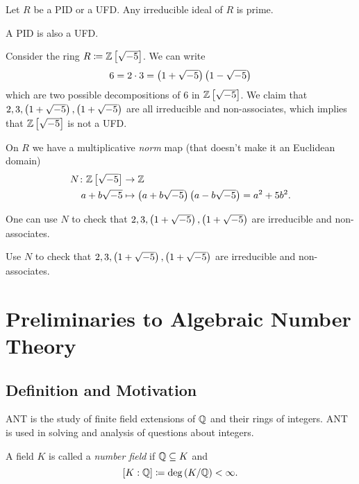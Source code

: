 \documentclass[11pt]{karticle}
\begin{document}
\begin{corollary}
Let $R$ be a PID or a UFD. Any irreducible ideal of $R$ is prime.
\end{corollary}

\begin{exercise}
A PID is also a UFD.
\end{exercise}

\begin{example}
Consider the ring $R \coloneqq \mathbb{Z}\left[ \sqrt{-5} \right]$. We can write
\[6 = 2 \cdot 3 = \left( 1 + \sqrt{-5} \right)\left( 1 - \sqrt{-5} \right)\]
which are two possible decompositions of $6$ in $\mathbb{Z}\left[ \sqrt{-5} \right]$. We claim that $2,3, \left( 1+\sqrt{-5} \right), \left( 1+\sqrt{-5} \right)$ are all irreducible and non-associates, which implies that $\mathbb{Z}\left[ \sqrt{-5} \right]$ is not a UFD.

On $R$ we have a multiplicative \emph{norm} map (that doesn't make it an Euclidean domain)
\begin{align*}
N \colon \mathbb{Z}\left[ \sqrt{-5} \right] &\to \mathbb{Z} \\
a + b\sqrt{-5} &\mapsto \left( a+b\sqrt{-5} \right)\left( a - b\sqrt{-5} \right) = a^2 + 5 b^2 \text{.}
\end{align*}

One can use $N$ to check that $2,3, \left( 1+\sqrt{-5} \right), \left( 1+\sqrt{-5} \right)$ are irreducible and non-associates.
\end{example}

\begin{exercise}
Use $N$ to check that $2,3, \left( 1+\sqrt{-5} \right), \left( 1+\sqrt{-5} \right)$ are irreducible and non-associates.
\end{exercise}

\section{Preliminaries to Algebraic Number Theory}

\subsection{Definition and Motivation}

ANT is the study of finite field extensions of $\mathbb{Q}$ and their rings of integers. ANT is used in solving and analysis of questions about integers.

\begin{definition}
A field $K$ is called a \emph{number field} if $\mathbb{Q} \subseteq K$ and \[\left[ K : \mathbb{Q} \right] \coloneqq \deg\left( K/\mathbb{Q} \right) < \infty \text{.}\]
\end{definition}
\end{document}
